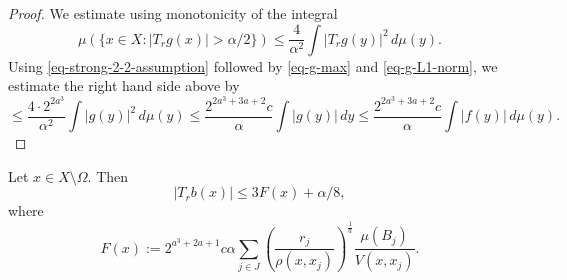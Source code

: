 \begin{proof}
    We estimate using monotonicity of the integral
\begin{equation*}
     \mu\left(\{x\in X: |T_r g(x)|>{\alpha}/2\}\right)\leq \frac{4}{\alpha^2} \int |T_r g(y)|^2\, d\mu(y).
\end{equation*}
Using \eqref{eq-strong-2-2-assumption} followed by \eqref{eq-g-max} and \eqref{eq-g-L1-norm}, we estimate the right hand side above by
\begin{equation}
    \label{eq-Hr-g}
    \leq \frac{4\cdot 2^{2a^3}}{\alpha^2} \int |g(y)|^2\, d\mu(y)\leq \frac{2^{2a^3+3a+2}c}{\alpha} \int |g(y)|\, dy \le \frac{2^{2a^3+3a+2}c}{\alpha} \int |f(y)|\, d\mu(y).
\end{equation}
\end{proof}

\begin{lemma}
    \label{estimate-bad-partial}
    \leanok
    Let $x\in X\setminus\Omega$. Then
    \begin{equation*}
        |T_rb(x)| \le 3F(x)+\alpha/8,
    \end{equation*}
    where
    \begin{equation*}
        F(x) := 2^{a^3+2a+1} c\alpha \sum_{j\in J} \left(\frac{r_j}{\rho(x,x_j)}\right)^{\frac{1}{a}}\frac{\mu(B_j)}{V(x,x_j)}.
    \end{equation*}
\end{lemma}

